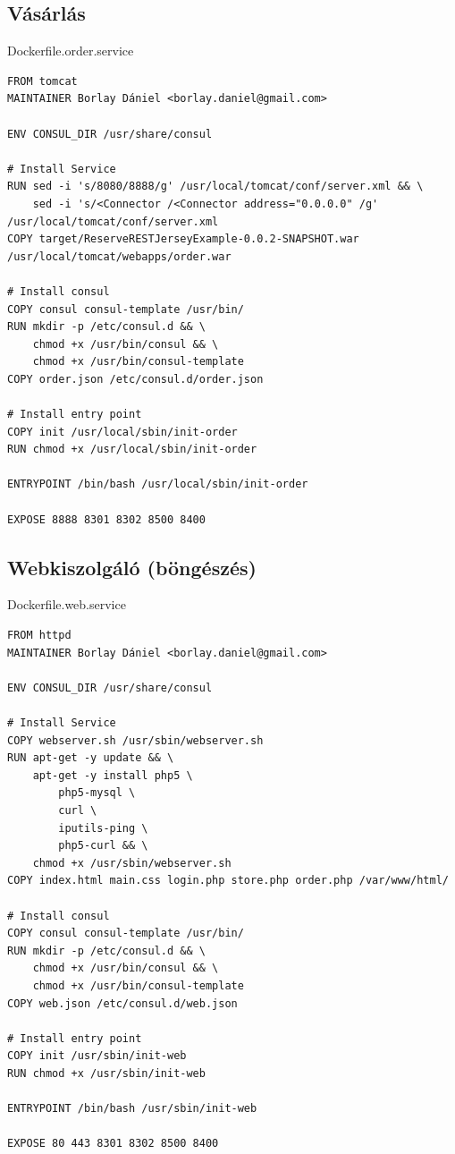 \documentclass[11pt,magyar,a4paper,twoside,]{report}
\begin{document}
\subsection{Vásárlás}\label{vuxe1suxe1rluxe1s}

Dockerfile.order.service

\begin{verbatim}
FROM tomcat
MAINTAINER Borlay Dániel <borlay.daniel@gmail.com>

ENV CONSUL_DIR /usr/share/consul

# Install Service
RUN sed -i 's/8080/8888/g' /usr/local/tomcat/conf/server.xml && \
    sed -i 's/<Connector /<Connector address="0.0.0.0" /g' /usr/local/tomcat/conf/server.xml
COPY target/ReserveRESTJerseyExample-0.0.2-SNAPSHOT.war /usr/local/tomcat/webapps/order.war

# Install consul
COPY consul consul-template /usr/bin/
RUN mkdir -p /etc/consul.d && \
    chmod +x /usr/bin/consul && \
    chmod +x /usr/bin/consul-template
COPY order.json /etc/consul.d/order.json

# Install entry point
COPY init /usr/local/sbin/init-order
RUN chmod +x /usr/local/sbin/init-order

ENTRYPOINT /bin/bash /usr/local/sbin/init-order

EXPOSE 8888 8301 8302 8500 8400
\end{verbatim}

\subsection{Webkiszolgáló
(böngészés)}\label{webkiszolguxe1luxf3-buxf6nguxe9szuxe9s}

Dockerfile.web.service

\begin{verbatim}
FROM httpd
MAINTAINER Borlay Dániel <borlay.daniel@gmail.com>

ENV CONSUL_DIR /usr/share/consul

# Install Service
COPY webserver.sh /usr/sbin/webserver.sh
RUN apt-get -y update && \
    apt-get -y install php5 \
        php5-mysql \
        curl \
        iputils-ping \
        php5-curl && \
    chmod +x /usr/sbin/webserver.sh
COPY index.html main.css login.php store.php order.php /var/www/html/

# Install consul
COPY consul consul-template /usr/bin/
RUN mkdir -p /etc/consul.d && \
    chmod +x /usr/bin/consul && \
    chmod +x /usr/bin/consul-template
COPY web.json /etc/consul.d/web.json

# Install entry point
COPY init /usr/sbin/init-web
RUN chmod +x /usr/sbin/init-web

ENTRYPOINT /bin/bash /usr/sbin/init-web

EXPOSE 80 443 8301 8302 8500 8400
\end{verbatim}
\end{document}
